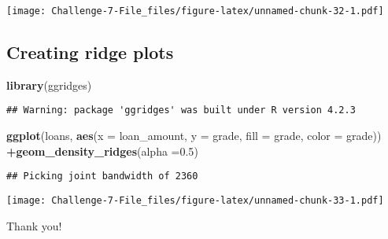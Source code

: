 \documentclass[
]{article}
\newenvironment{Shaded}{\begin{snugshade}}{\end{snugshade}}
\newcommand{\AttributeTok}[1]{\textcolor[rgb]{0.13,0.29,0.53}{#1}}
\newcommand{\FloatTok}[1]{\textcolor[rgb]{0.00,0.00,0.81}{#1}}
\newcommand{\FunctionTok}[1]{\textcolor[rgb]{0.13,0.29,0.53}{\textbf{#1}}}
\newcommand{\NormalTok}[1]{#1}
\newcommand{\SpecialCharTok}[1]{\textcolor[rgb]{0.81,0.36,0.00}{\textbf{#1}}}
\begin{document}
\texttt{[image: Challenge-7-File\_files/figure-latex/unnamed-chunk-32-1.pdf]}

\hypertarget{creating-ridge-plots}{%
\subsection{Creating ridge plots}\label{creating-ridge-plots}}

\begin{Shaded}
\begin{Highlighting}[]
\FunctionTok{library}\NormalTok{(ggridges)}
\end{Highlighting}
\end{Shaded}

\begin{verbatim}
## Warning: package 'ggridges' was built under R version 4.2.3
\end{verbatim}

\begin{Shaded}
\begin{Highlighting}[]
\FunctionTok{ggplot}\NormalTok{(loans, }\FunctionTok{aes}\NormalTok{(}\AttributeTok{x =}\NormalTok{ loan\_amount, }\AttributeTok{y =}\NormalTok{ grade, }\AttributeTok{fill =}\NormalTok{ grade, }\AttributeTok{color =}\NormalTok{ grade)) }\SpecialCharTok{+}\FunctionTok{geom\_density\_ridges}\NormalTok{(}\AttributeTok{alpha =}\FloatTok{0.5}\NormalTok{)}
\end{Highlighting}
\end{Shaded}

\begin{verbatim}
## Picking joint bandwidth of 2360
\end{verbatim}

\texttt{[image: Challenge-7-File\_files/figure-latex/unnamed-chunk-33-1.pdf]}

Thank you!
\end{document}
